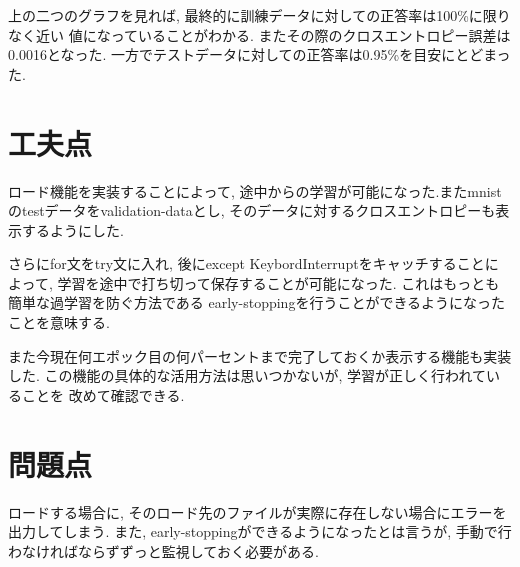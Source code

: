 \documentclass[a4paper,11pt]{jsarticle}
\begin{document}
上の二つのグラフを見れば, 最終的に訓練データに対しての正答率は100\%に限りなく近い
値になっていることがわかる. またその際のクロスエントロピー誤差は0.0016となった.
一方でテストデータに対しての正答率は0.95\%を目安にとどまった. 

\section{工夫点}
ロード機能を実装することによって, 途中からの学習が可能になった.またmnistのtestデータをvalidation-dataとし, そのデータに対するクロスエントロピーも表示するようにした.

さらにfor文をtry文に入れ, 後にexcept KeybordInterruptをキャッチすることによって, 
学習を途中で打ち切って保存することが可能になった. これはもっとも簡単な過学習を防ぐ方法である
early-stoppingを行うことができるようになったことを意味する.

また今現在何エポック目の何パーセントまで完了しておくか表示する機能も実装した.
この機能の具体的な活用方法は思いつかないが, 学習が正しく行われていることを
改めて確認できる.

\section{問題点}
ロードする場合に, そのロード先のファイルが実際に存在しない場合にエラーを出力してしまう.
また, early-stoppingができるようになったとは言うが, 手動で行わなければならずずっと監視しておく必要がある.
\end{document}
